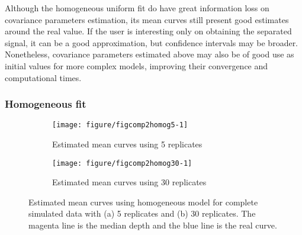 Although the homogeneous uniform fit do have great information loss on covariance parameters estimation, its mean curves still present good estimates around the real value. If the user is interesting only on obtaining the separated signal, it can be a good approximation, but confidence intervals may be broader. Nonetheless, covariance parameters estimated above may also be of good use as initial values for more complex models, improving their convergence and computational times.  

\subsubsection{Homogeneous fit}
\label{sec:comp2homog}






\begin{figure}[!t]
  \centering
  \begin{subfigure}{\textwidth}
    \centering
\begin{knitrout}
\color{fgcolor}
\texttt{[image: figure/figcomp2homog5-1]} 

\end{knitrout}
    \caption{Estimated mean curves using 5 replicates}
  \end{subfigure}
  \begin{subfigure}{\textwidth}
    \centering
\begin{knitrout}
\color{fgcolor}
\texttt{[image: figure/figcomp2homog30-1]} 

\end{knitrout}
    \caption{Estimated mean curves using 30 replicates}
  \end{subfigure}
  \caption{Estimated mean curves using homogeneous model for complete simulated data with (a) 5 replicates and (b) 30 replicates. The magenta line is the median depth and the blue line is the real curve.}
  \label{fig:mpc-comp2homog}
\end{figure}

